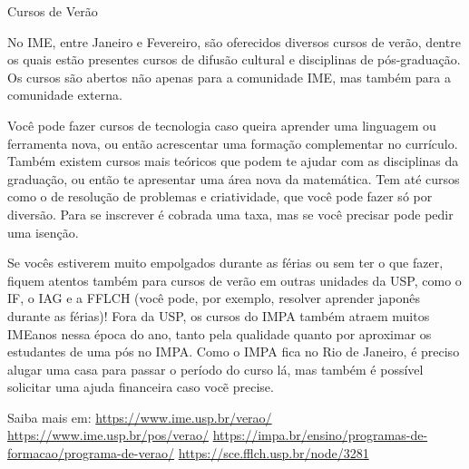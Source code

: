\begin{secao}{Cursos de Verão}

No IME, entre Janeiro e Fevereiro, são oferecidos diversos cursos de verão,
dentre os quais estão presentes cursos de difusão cultural e disciplinas de
pós-graduação. Os cursos são abertos não apenas para a comunidade IME, mas
também para a comunidade externa.

Você pode fazer cursos de tecnologia caso queira aprender uma linguagem ou ferramenta nova, 
ou então acrescentar uma formação complementar no currículo. Também existem cursos mais teóricos 
que podem te ajudar com as disciplinas da graduação, ou então te apresentar uma área nova da matemática. 
Tem até cursos como o de resolução de problemas e criatividade, que você pode fazer só por diversão. 
Para se inscrever é cobrada uma taxa, mas se você precisar pode pedir uma isenção. 

Se vocês estiverem muito empolgados durante as férias ou sem ter o que fazer, fiquem atentos também para 
cursos de verão em outras unidades da USP, como o IF, o IAG e a FFLCH (você pode, por exemplo, resolver aprender 
japonês durante as férias)! Fora da USP, os cursos do IMPA também atraem muitos IMEanos nessa época do ano, tanto 
pela qualidade quanto por aproximar os estudantes de uma pós no IMPA. Como o IMPA fica no Rio de Janeiro, é preciso 
alugar uma casa para passar o período do curso lá, mas também é possível solicitar uma ajuda financeira caso vocẽ precise.


Saiba mais em: 
\url{https://www.ime.usp.br/verao/}
\url{https://www.ime.usp.br/pos/verao/}
\url{https://impa.br/ensino/programas-de-formacao/programa-de-verao/}
\url{https://sce.fflch.usp.br/node/3281}

\end{secao}
